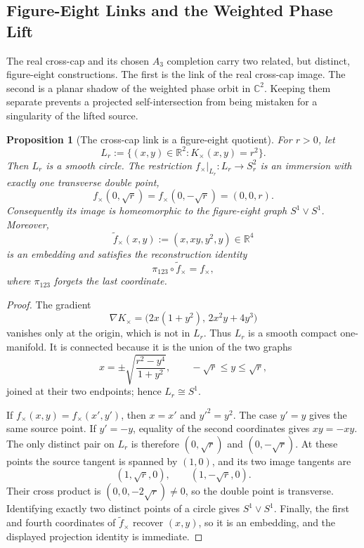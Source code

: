 \documentclass[11pt]{article}
\newtheorem{proposition}[theorem]{Proposition}
\begin{document}
\subsection{Figure-Eight Links and the Weighted Phase Lift}

The real cross-cap and its chosen $A_3$ completion carry two related, but
distinct, figure-eight constructions.  The first is the link of the real
cross-cap image.  The second is a planar shadow of the weighted phase orbit in
$\mathbb C^2$.  Keeping them separate prevents a projected self-intersection
from being mistaken for a singularity of the lifted source.

\begin{proposition}[The cross-cap link is a figure-eight quotient]
\label{prop:crosscap_figure_eight}
For $r>0$, let
\[
 L_r:=\{(x,y)\in\mathbb R^2:K_\times(x,y)=r^2\}.
\]
Then $L_r$ is a smooth circle.  The restriction
$f_\times|_{L_r}:L_r\to S_r^2$ is an immersion with exactly one transverse
double point,
\[
 f_\times(0,\sqrt r)=f_\times(0,-\sqrt r)=(0,0,r).
\]
Consequently its image is homeomorphic to the figure-eight graph
$S^1\vee S^1$.  Moreover,
\[
 \widetilde f_\times(x,y):=(x,xy,y^2,y)\in\mathbb R^4
\]
is an embedding and satisfies the reconstruction identity
\[
 \pi_{123}\circ\widetilde f_\times=f_\times,
\]
where $\pi_{123}$ forgets the last coordinate.
\end{proposition}

\begin{proof}
The gradient
\[
 \nabla K_\times
 =\bigl(2x(1+y^2),\,2x^2y+4y^3\bigr)
\]
vanishes only at the origin, which is not in $L_r$.  Thus $L_r$ is a smooth
compact one-manifold.  It is connected because it is the union of the two
graphs
\[
 x=\pm\sqrt{\frac{r^2-y^4}{1+y^2}},
 \qquad -\sqrt r\le y\le\sqrt r,
\]
joined at their two endpoints; hence $L_r\cong S^1$.

If $f_\times(x,y)=f_\times(x',y')$, then $x=x'$ and $y'^2=y^2$.
The case $y'=y$ gives the same source point.  If $y'=-y$, equality of the
second coordinates gives $xy=-xy$.  The only distinct pair on $L_r$ is
therefore $(0,\sqrt r)$ and $(0,-\sqrt r)$.  At these points the source
tangent is spanned by $(1,0)$, and its two image tangents are
\[
 (1,\sqrt r,0),\qquad (1,-\sqrt r,0).
\]
Their cross product is $(0,0,-2\sqrt r)\ne0$, so the double point is
transverse.  Identifying exactly two distinct points of a circle gives
$S^1\vee S^1$.  Finally, the first and fourth coordinates of
$\widetilde f_\times$ recover $(x,y)$, so it is an embedding, and the displayed
projection identity is immediate.
\end{proof}
\end{document}
